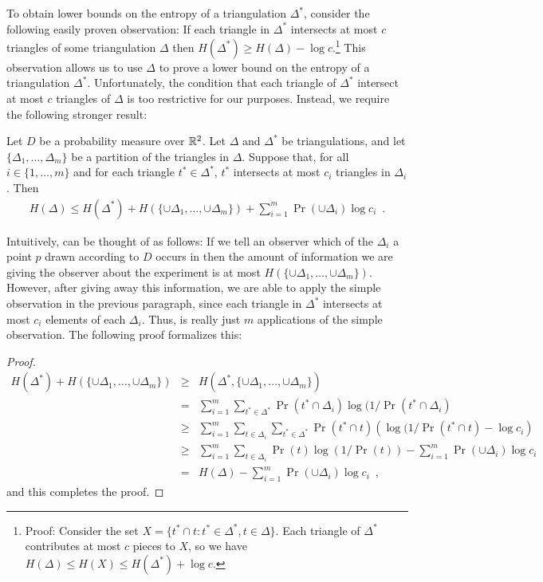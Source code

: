 \documentclass[lotsofwhite]{patmorin}
\begin{document}
To obtain lower bounds on the entropy of a triangulation $\Delta^*$,
consider the following easily proven observation: If each triangle in
$\Delta^*$ intersects at most $c$ triangles of some triangulation
$\Delta$ then $H(\Delta^*) \ge H(\Delta) - \log c$.\footnote{Proof:
Consider the set $X=\{ t^*\cap t : t^*\in\Delta^*, t\in \Delta\}$.
Each triangle of $\Delta^*$ contributes at most $c$ pieces to $X$, so
we have $H(\Delta) \le H(X) \le H(\Delta^*) + \log c$.}  This
observation allows us to use $\Delta$ to prove a lower bound on the
entropy of a triangulation $\Delta^*$.  Unfortunately, the condition
that each triangle of $\Delta^*$ intersect at most $c$ triangles of
$\Delta$ is too restrictive for our purposes.  Instead, we require
the following stronger result:

\begin{lem}
Let $D$ be a probability measure over $\mathbb{R}^2$.  Let $\Delta$ and
$\Delta^*$ be triangulations, and let $\{\Delta_1,\ldots,\Delta_m\}$
be a partition of the triangles in $\Delta$.  Suppose that, for all
$i\in\{1,\ldots,m\}$ and for each triangle $t^*\in\Delta^*$, $t^*$
intersects at most $c_i$ triangles in $\Delta_i$.  Then
\begin{eqnarray*}
   H(\Delta) \le 
	 H(\Delta^*) + H(\{\cup\Delta_1,\ldots,\cup\Delta_m\}) + 
	\sum_{i=1}^m \Pr(\cup\Delta_i)\log c_i
 \enspace . 
\end{eqnarray*}
\end{lem}

Intuitively,  can be thought of as follows:  If we tell
an observer which of the $\Delta_i$ a point $p$ drawn according to $D$
occurs in then the amount of information we are giving the observer
about the experiment is at most
$H(\{\cup\Delta_1,\ldots,\cup\Delta_m\})$.  However, after giving away
this information, we are able to apply the simple observation in the
previous paragraph, since each triangle in $\Delta^*$ intersects at
most $c_i$ elements of each $\Delta_i$.  Thus,  is
really just $m$ applications of the simple observation.  The following
proof formalizes this:

\begin{proof}
\begin{eqnarray*}
   H(\Delta^*)  +H(\{\cup\Delta_1,\ldots,\cup\Delta_m\})
     & \ge & H(\Delta^*,\{\cup\Delta_1,\ldots,\cup\Delta_m\}) \\
     &  =  & \sum_{i=1}^m
              \sum_{t^*\in\Delta^*}
               \Pr(t^*\cap\Delta_i)\log (1/\Pr(t^*\cap\Delta_i) \\
     & \ge & \sum_{i=1}^m
              \sum_{t\in\Delta_i}
               \sum_{t^*\in\Delta^*}
                  \Pr(t^*\cap t)
                    \left(\log (1/\Pr(t^*\cap t) - \log c_i \right) \\
     & \ge  & \sum_{i=1}^m 
               \sum_{t\in\Delta_i}
                \Pr(t)\log(1/\Pr(t)) 
                -\sum_{i=1}^m \Pr(\cup\Delta_i)\log c_i  \\
     &  =  & H(\Delta) -\sum_{i=1}^m \Pr(\cup\Delta_i)\log c_i
            \enspace ,
\end{eqnarray*}
and this completes the proof.
\end{proof}
\end{document}

